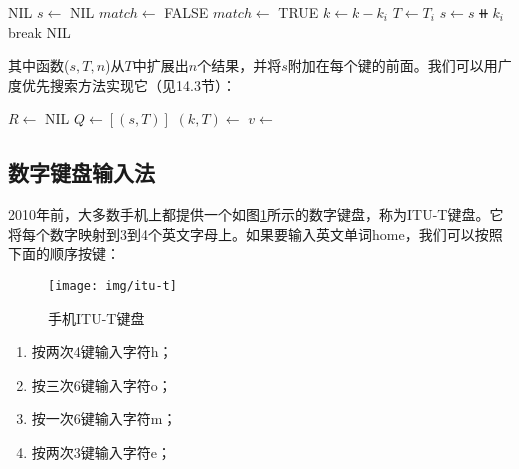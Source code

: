 \documentclass[b5paper]{ctexart}
\begin{document}
\begin{algorithmic}[1]
     \State \Return NIL
  \EndIf
  \State $s \gets$ NIL
  \Repeat
    \State $match \gets$ FALSE
        \State \Return {}
      \EndIf
        \State $match \gets$ TRUE
        \State $k \gets k - k_i$  
        \State $T \gets T_i$
        \State $s \gets s \doubleplus k_i$
        \State break
      \EndIf
    \EndFor
  \State \Return NIL
\EndFunction
\end{algorithmic}

其中函数($s, T, n$)从$T$中扩展出$n$个结果，并将$s$附加在每个键的前面。我们可以用广度优先搜索方法实现它（见14.3节）：

\begin{algorithmic}[1]
  \State $R \gets $ NIL
  \State $Q \gets [(s, T)]$
    \State $(k, T) \gets$ 
    \State $v \gets$ 
      \State {}
    \EndIf
      \State {}
    \EndFor
  \EndWhile
\EndFunction
\end{algorithmic}


\subsection{数字键盘输入法}

2010年前，大多数手机上都提供一个如图\ref{fig:itut-keypad}所示的数字键盘，称为ITU-T键盘。它将每个数字映射到3到4个英文字母上。如果要输入英文单词home，我们可以按照下面的顺序按键：

\begin{figure}[htbp]
  \centering
  \texttt{[image: img/itu-t]}
  \caption{手机ITU-T键盘}
  \label{fig:itut-keypad}
\end{figure}

\begin{enumerate}
\item 按两次4键输入字符h；
\item 按三次6键输入字符o；
\item 按一次6键输入字符m；
\item 按两次3键输入字符e；
\end{enumerate}
\end{document}

